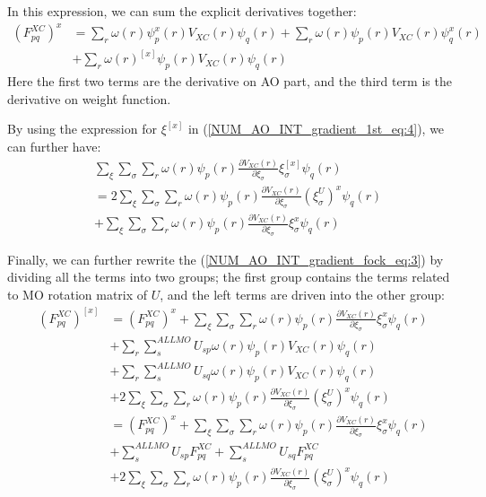 In this expression, we can sum the explicit derivatives together:
\begin{align}
(F^{XC}_{pq})^{x} &=  \sum_{r}\omega(r)\psi_{p}^{x}(r) V_{XC}(r) \psi_{q}(r) 
+  \sum_{r}\omega(r)\psi_{p}(r) V_{XC}(r) \psi_{q}^{x}(r) \nonumber \\ 
&+  \sum_{r}\omega(r)^{[x]}\psi_{p}(r) V_{XC}(r)\psi_{q}(r) 
\end{align}
Here the first two terms are the derivative on AO part, and the third term is
the derivative on weight function.

By using the expression for $\xi^{[x]}$ in
(\ref{NUM_AO_INT_gradient_1st_eq:4}), we can further have:
\begin{align}
\label{NUM_AO_INT_gradient_fock_eq:5}
&\sum_{\xi}\sum_{\sigma}\sum_{r}\omega(r)\psi_{p}(r)\frac{\partial 
V_{XC}(r)}{\partial \xi_{\sigma}}\xi_{\sigma}^{[x]} \psi_{q}(r) \nonumber \\
&=
2\sum_{\xi}\sum_{\sigma}\sum_{r}\omega(r)\psi_{p}(r)\frac{\partial 
V_{XC}(r)}{\partial \xi_{\sigma}}(\xi_{\sigma}^{U})^{x} \psi_{q}(r) \nonumber
\\
&+ \sum_{\xi}\sum_{\sigma}\sum_{r}\omega(r)\psi_{p}(r)\frac{\partial 
V_{XC}(r)}{\partial \xi_{\sigma}}\xi_{\sigma}^{x} \psi_{q}(r) 
\end{align}

Finally, we can further rewrite the (\ref{NUM_AO_INT_gradient_fock_eq:3}) by
dividing all the terms into two groups; the first group contains the terms
related to MO rotation matrix of $U$, and the left terms are driven into the
other group:
\begin{equation}
 \begin{split}
 (F^{XC}_{pq})^{[x]} &= (F^{XC}_{pq})^{x} + 
\sum_{\xi}\sum_{\sigma}\sum_{r}\omega(r)\psi_{p}(r)\frac{\partial 
V_{XC}(r)}{\partial \xi_{\sigma}}\xi_{\sigma}^{x} \psi_{q}(r)   \\
&+  \sum_{r}\sum_{s}^{ALL MO}U_{sp}\omega(r)\psi_{p}(r)V_{XC}(r) \psi_{q}(r) \\
&+  \sum_{r}\sum_{s}^{ALL MO}U_{sq}\omega(r)\psi_{p}(r)V_{XC}(r) \psi_{q}(r) 
 \\
&+ 2\sum_{\xi}\sum_{\sigma}\sum_{r}\omega(r)\psi_{p}(r)\frac{\partial 
V_{XC}(r)}{\partial \xi_{\sigma}}(\xi_{\sigma}^{U})^{x} \psi_{q}(r) \\
&= (F^{XC}_{pq})^{x} + 
\sum_{\xi}\sum_{\sigma}\sum_{r}\omega(r)\psi_{p}(r)\frac{\partial 
V_{XC}(r)}{\partial \xi_{\sigma}}\xi_{\sigma}^{x} \psi_{q}(r)   \\
&+ \sum_{s}^{ALL MO}U_{sp}F^{XC}_{pq} +  \sum_{s}^{ALL MO}U_{sq}F^{XC}_{pq} \\
&+ 2\sum_{\xi}\sum_{\sigma}\sum_{r}\omega(r)\psi_{p}(r)\frac{\partial 
V_{XC}(r)}{\partial \xi_{\sigma}}(\xi_{\sigma}^{U})^{x} \psi_{q}(r)
 \end{split}
\label{NUM_AO_INT_gradient_fock_eq:6}
\end{equation}

